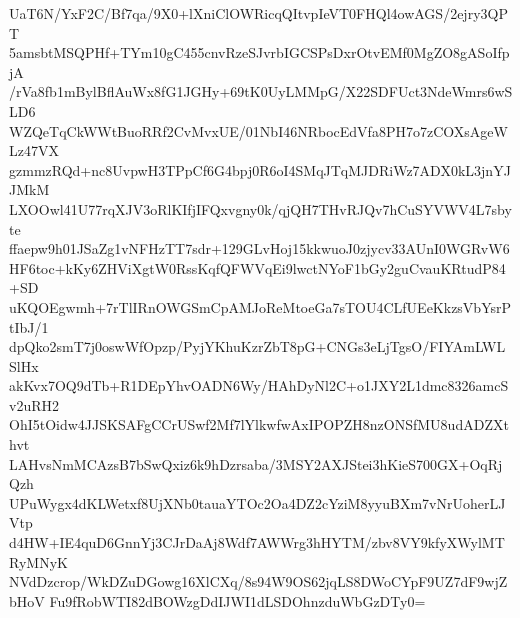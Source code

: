 UaT6N/YxF2C/Bf7qa/9X0+lXniClOWRicqQItvpIeVT0FHQl4owAGS/2ejry3QPT
5amsbtMSQPHf+TYm10gC455cnvRzeSJvrbIGCSPsDxrOtvEMf0MgZO8gASoIfpjA
/rVa8fb1mBylBflAuWx8fG1JGHy+69tK0UyLMMpG/X22SDFUct3NdeWmrs6wSLD6
WZQeTqCkWWtBuoRRf2CvMvxUE/01NbI46NRbocEdVfa8PH7o7zCOXsAgeWLz47VX
gzmmzRQd+nc8UvpwH3TPpCf6G4bpj0R6oI4SMqJTqMJDRiWz7ADX0kL3jnYJJMkM
LXOOwl41U77rqXJV3oRlKIfjIFQxvgny0k/qjQH7THvRJQv7hCuSYVWV4L7sbyte
ffaepw9h01JSaZg1vNFHzTT7sdr+129GLvHoj15kkwuoJ0zjycv33AUnI0WGRvW6
HF6toc+kKy6ZHViXgtW0RssKqfQFWVqEi9lwctNYoF1bGy2guCvauKRtudP84+SD
uKQOEgwmh+7rTlIRnOWGSmCpAMJoReMtoeGa7sTOU4CLfUEeKkzsVbYsrPtIbJ/1
dpQko2smT7j0oswWfOpzp/PyjYKhuKzrZbT8pG+CNGs3eLjTgsO/FIYAmLWLSlHx
akKvx7OQ9dTb+R1DEpYhvOADN6Wy/HAhDyNl2C+o1JXY2L1dmc8326amcSv2uRH2
OhI5tOidw4JJSKSAFgCCrUSwf2Mf7lYlkwfwAxIPOPZH8nzONSfMU8udADZXthvt
LAHvsNmMCAzsB7bSwQxiz6k9hDzrsaba/3MSY2AXJStei3hKieS700GX+OqRjQzh
UPuWygx4dKLWetxf8UjXNb0tauaYTOc2Oa4DZ2cYziM8yyuBXm7vNrUoherLJVtp
d4HW+IE4quD6GnnYj3CJrDaAj8Wdf7AWWrg3hHYTM/zbv8VY9kfyXWylMTRyMNyK
NVdDzcrop/WkDZuDGowg16XlCXq/8s94W9OS62jqLS8DWoCYpF9UZ7dF9wjZbHoV
Fu9fRobWTI82dBOWzgDdIJWI1dLSDOhnzduWbGzDTy0=
